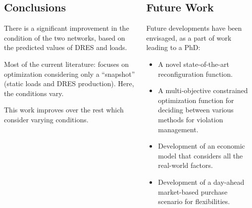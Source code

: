 \documentclass[final]{beamer}
\begin{document}
\begin{frame}[t]
\begin{columns}
\begin{column}{0.5\linewidth}
\subsection{Conclusions}
There is a significant improvement in the condition of the two networks, based on the predicted values of DRES and loads.
\setlength{\parskip}{0.3cm}

Most of the current literature: focuses on optimization considering only a ``snapshot'' (static loads and DRES production). Here, the conditions vary.
\setlength{\parskip}{0.3cm}

This work improves over the rest which consider varying conditions.
\end{column}

\begin{column}{0.5\linewidth}
\subsection{Future Work}
Future developments have been envisaged, as a part of work leading to a PhD:
\setlength{\parskip}{0.3cm}

\begin{itemize}
\item A novel state-of-the-art reconfiguration function.

\item A multi-objective constrained optimization function for deciding between various methods for violation management.

\item Development of an economic model that considers all the real-world factors.

\item Development of a day-ahead market-based purchase scenario for flexibilities.
\end{itemize}
\end{column}
\end{columns}
\end{frame}
\end{document}
